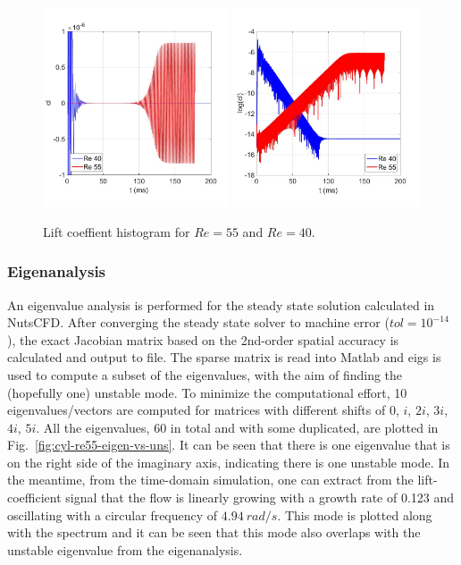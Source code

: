 \documentclass[journal,final]{new-aiaa}
\begin{document}
\begin{figure}[htb]
	\centering   
	\includegraphics[width=0.49\textwidth]{pic/cl-linear.jpg}	\includegraphics[width=0.49\textwidth]{pic/cl-log.jpg}
	\caption{Lift coeffient histogram for $Re=55$ and $Re=40$.}
	\label{fig:cyl-re40-re55-uns}
\end{figure}

\subsubsection{Eigenanalysis}
An eigenvalue analysis is performed for the steady state solution calculated
in NutsCFD. After converging the steady state solver to machine error ($tol=10^{-14}$),
the exact Jacobian matrix based on the 2nd-order spatial accuracy is calculated and
output to file. The sparse matrix is read into Matlab and eigs is used to compute
a subset of the eigenvalues, with the aim of finding the (hopefully one) unstable mode.
To minimize the computational effort, 10 eigenvalues/vectors are computed for
matrices with different shifts of $0$, $i$, $2i$, $3i$, $4i$, $5i$. All the eigenvalues,
60 in total and with some duplicated, are plotted in Fig.~\ref{fig:cyl-re55-eigen-vs-uns}.
It can be seen that there is one eigenvalue that is on the right side of the imaginary axis,
indicating there is one unstable mode. In the meantime, from the time-domain simulation,
one can extract from the lift-coefficient signal that the flow is linearly growing with a
growth rate of 0.123 and oscillating with a circular frequency of $4.94~rad/s$. This
mode is plotted along with the spectrum and it can be seen that this mode also overlaps
with the unstable eigenvalue from the eigenanalysis. 
\end{document}
